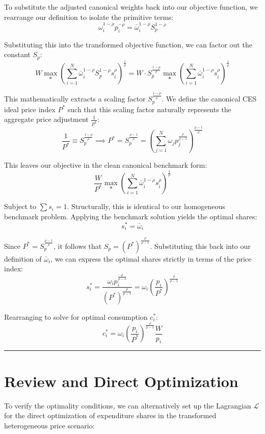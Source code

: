 \documentclass{article}
\begin{document}
To substitute the adjusted canonical weights back into our objective function, we rearrange our definition to isolate the primitive terms:
$$ \omega_i^{1-\rho} p_i^{-\rho} = \bar{\omega}_i^{1-\rho} S_p^{1-\rho} $$

Substituting this into the transformed objective function, we can factor out the constant $S_p$:
$$ W \max_{\boldsymbol{s}} \left( \sum_{i=1}^N \bar{\omega}_i^{1-\rho} S_p^{1-\rho} s_i^\rho \right)^{\frac{1}{\rho}} = W \cdot S_p^{\frac{1-\rho}{\rho}} \max_{\boldsymbol{s}} \left( \sum_{i=1}^N \bar{\omega}_i^{1-\rho} s_i^\rho \right)^{\frac{1}{\rho}} $$

This mathematically extracts a scaling factor $S_p^{\frac{1-\rho}{\rho}}$. We define the canonical CES ideal price index $P^*$ such that this scaling factor naturally represents the aggregate price adjustment $\frac{1}{P^*}$:
$$ \frac{1}{P^*} \equiv S_p^{\frac{1-\rho}{\rho}} \implies P^* = S_p^{\frac{\rho-1}{\rho}} = \left( \sum_{j=1}^N \omega_j p_j^{\frac{\rho}{\rho-1}} \right)^{\frac{\rho-1}{\rho}} $$

This leaves our objective in the clean canonical benchmark form:
$$ \frac{W}{P^*} \max_{\boldsymbol{s}} \left( \sum_{i=1}^N \bar{\omega}_i^{1-\rho} s_i^\rho \right)^{\frac{1}{\rho}} $$

Subject to $\sum s_i = 1$. Structurally, this is identical to our
homogeneous benchmark problem. Applying the benchmark solution yields
the optimal shares:
$$ s_i^* = \bar{\omega}_i $$

Since $P^* = S_p^{\frac{\rho-1}{\rho}}$, it follows that $S_p = (P^*)^{\frac{\rho}{\rho-1}}$. Substituting this back into our definition of $\bar{\omega}_i$, we can express the optimal shares strictly in terms of the price index:
$$ s_i^* = \frac{\omega_i p_i^{\frac{\rho}{\rho-1}}}{(P^*)^{\frac{\rho}{\rho-1}}} = \omega_i \left( \frac{p_i}{P^*} \right)^{\frac{\rho}{\rho-1}} $$

Rearranging to solve for optimal consumption $c_i^*$:
$$ c_i^* = \omega_i \left( \frac{p_i}{P^*} \right)^{\frac{\rho}{\rho-1}} \frac{W}{p_i} $$

\vspace{1em}\hrule\vspace{1em}

\section{Review and Direct Optimization}

To verify the optimality conditions, we can alternatively set up the
Lagrangian $\mathcal{L}$ for the direct optimization of expenditure
shares in the transformed heterogeneous price scenario:
\end{document}
